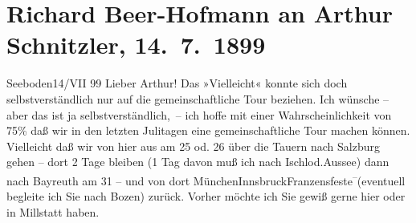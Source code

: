 

         
         \newcommand{\erwaehntePersonen}{Personen: Gustav Schwarzkopf}
         \newcommand{\erwaehnteOrte}{Orte: Bad Aussee, Bad Ischl, Bayreuth, Bozen, Franzensfeste, Hohe Tauern, Innsbruck, Millstatt, München, Salzburg, Seeboden, Velden am Wörthersee}
         \newcommand{\erwaehnteWerke}{Werke: Der Tod Georgs}
               \section[Richard Beer-Hofmann an Arthur Schnitzler, 14. 7. 1899]{ Richard Beer-Hofmann an Arthur Schnitzler, 14. 7. 1899}\nopagebreak{}\rehead{ }\begin{ledgroupsized}[t]{13cm}\normalsize\beginnumbering \toendnotes[C]{\smallbreak\pagebreak[2]} 
\toendnotes[C]{\smallbreak}\pstart
           \centering{}{\pb}Seeboden14/VII 99\pend
           \pstart
           Lieber Arthur! Das »Vielleicht« konnte sich doch selbstverständlich
               nur auf die gemeinschaftliche Tour beziehen. Ich wünsche – aber das ist ja
               selbstverständlich, – ich hoffe mit einer Wahrscheinlichkeit von 75{\%} daß wir in den letzten Julitagen eine gemeinschaftliche
               Tour machen können. Vielleicht daß wir von hier aus {\pb}am 25 od.
                  26 über die Tauern nach Salzburg gehen – dort 2 Tage bleiben (1 Tag davon muß ich nach
                  Ischl\introOben{}od.\introOben{}{ }Aussee) dann nach Bayreuth am 31 – und von dort MünchenInnsbruckFranzensfeste\substVorne{}\textsuperscript{–}\substDazwischen{}(\substHinten{}eventuell begleite ich Sie nach Bozen\introOben{})\introOben{} zurück. Vorher möchte ich Sie gewiß gerne hier oder in Millstatt haben.\pend

\end{ledgroupsized}
